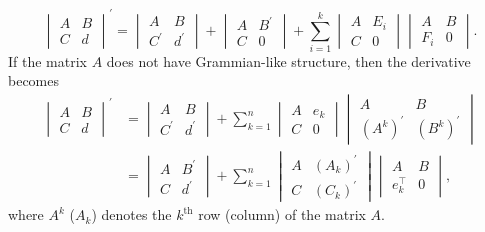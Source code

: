 \documentclass[11p,reqno]{amsart}
\numberwithin{equation}{section}
\numberwithin{equation}{section}
\begin{document}
\begin{equation} \label{dquasigrammian}
    \begin{vmatrix}
        A & B \\
        C & \boxed{d}
    \end{vmatrix}^{\prime} = 
    \begin{vmatrix} 
        A & B \\ 
        C^{\prime} & \boxed{d^{\prime}} 
    \end{vmatrix} + 
    \begin{vmatrix} 
        A & B^{\prime} \\ 
        C & \boxed{0} 
    \end{vmatrix} + \sum_{i=1}^{k} 
    \begin{vmatrix} 
        A & E_i \\ 
        C & \boxed{0} 
    \end{vmatrix} 
    \begin{vmatrix} 
        A & B \\ 
        F_i & \boxed{0} 
    \end{vmatrix}.
\end{equation}
If the matrix $A$ does not have Grammian-like structure, then the derivative becomes
\begin{equation} \label{dquasiwronskian}
    \begin{split}
    \begin{vmatrix}
        A & B \\
        C & \boxed{d}
    \end{vmatrix}^{\prime} 
    & = 
    \begin{vmatrix}
        A & B \\
        C^{\prime} & \boxed{d^{\prime}}
    \end{vmatrix} 
        + \sum_{k=1}^{n} \begin{vmatrix}
        A & e_k \\
        C & \boxed{0}
    \end{vmatrix} 
    \begin{vmatrix}
        A & B \\
        (A^k)^{\prime} & \boxed{(B^k)^{\prime}}
    \end{vmatrix} \\
    & =
    \begin{vmatrix}
        A & B^{\prime} \\
        C & \boxed{d^{\prime}}
    \end{vmatrix} 
        + \sum_{k=1}^{n} 
    \begin{vmatrix}
        A & (A_k)^{\prime} \\
        C & \boxed{(C_k)^{\prime}}
    \end{vmatrix} 
    \begin{vmatrix}
        A & B \\
        e_k^\top & \boxed{0}
    \end{vmatrix},
\end{split}
\end{equation}
where $A^k$ ($A_k$) denotes the $k^\text{th}$ row (column) of the matrix $A$.
\end{document}
